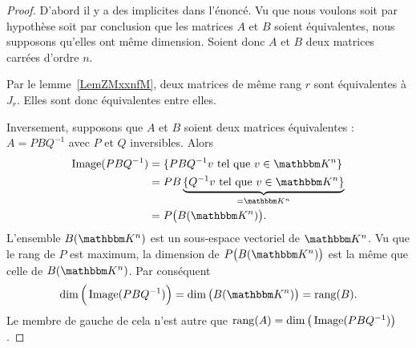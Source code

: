 \begin{proof}
    D'abord il y a des implicites dans l'énoncé. Vu que nous voulons soit par hypothèse soit par conclusion que les matrices \( A\) et \( B\) soient équivalentes, nous supposons qu'elles ont même dimension. Soient donc \( A\) et \( B\) deux matrices carrées d'ordre \( n \).

    Par le lemme~\ref{LemZMxxnfM}, deux matrices de même rang \( r\) sont équivalentes à \( J_r\). Elles sont donc équivalentes entre elles.

    Inversement, supposons que \( A\) et \( B\) soient deux matrices équivalentes : \( A=PBQ^{-1}\) avec \( P\) et \( Q\) inversibles. Alors
    \begin{subequations}
        \begin{align}
            \Image(PBQ^{-1})&=\{ PBQ^{-1}v\tq v\in \eK^n \}\\
            &=PB\underbrace{\{ Q^{-1}v\tq v\in \eK^n \}}_{=\eK^n}\\
            &=P\big( B(\eK^n) \big).
        \end{align}
    \end{subequations}
    L'ensemble \( B(\eK^n)\) est un sous-espace vectoriel de \( \eK^n\). Vu que le rang de \( P\) est maximum, la dimension de \( P\big( B(\eK^n) \big)\) est la même que celle de \( B(\eK^n)\). Par conséquent
    \begin{equation}
        \dim\Big( \Image(PBQ^{-1}) \Big)=\dim\big( B(\eK^n) \big)=\rang(B).
    \end{equation}
    Le membre de gauche de cela n'est autre que \( \operatorname{rang}(A)=\dim\big( \operatorname{Image}(PBQ^{-1}) \big)\).
\end{proof}
